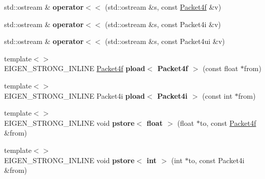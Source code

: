 \begin{DoxyCompactItemize}
std\+::ostream \& {\bfseries operator$<$$<$} (std\+::ostream \&s, const \hyperlink{struct_eigen_1_1internal_1_1_packet4f}{Packet4f} \&v)
\item 
\mbox{\label{namespace_eigen_1_1internal_a0d0a3677eb761c7d67b3e233c6579fae}} 
std\+::ostream \& {\bfseries operator$<$$<$} (std\+::ostream \&s, const Packet4i \&v)
\item 
\mbox{\label{namespace_eigen_1_1internal_aa6202cd36045cfe9df10d714518c698e}} 
std\+::ostream \& {\bfseries operator$<$$<$} (std\+::ostream \&s, const Packet4ui \&v)
\item 
\mbox{\label{namespace_eigen_1_1internal_a63e92b056e3378b0853f510fdb6757b2}} 
{\footnotesize template$<$$>$ }\\E\+I\+G\+E\+N\+\_\+\+S\+T\+R\+O\+N\+G\+\_\+\+I\+N\+L\+I\+NE \hyperlink{struct_eigen_1_1internal_1_1_packet4f}{Packet4f} {\bfseries pload$<$ Packet4f $>$} (const float $\ast$from)
\item 
\mbox{\label{namespace_eigen_1_1internal_ae1c0b08faef0da90bb6fa78856bcf726}} 
{\footnotesize template$<$$>$ }\\E\+I\+G\+E\+N\+\_\+\+S\+T\+R\+O\+N\+G\+\_\+\+I\+N\+L\+I\+NE Packet4i {\bfseries pload$<$ Packet4i $>$} (const int $\ast$from)
\item 
\mbox{\label{namespace_eigen_1_1internal_a9ee8e4444b597c94c387d0c22c85adb3}} 
{\footnotesize template$<$$>$ }\\E\+I\+G\+E\+N\+\_\+\+S\+T\+R\+O\+N\+G\+\_\+\+I\+N\+L\+I\+NE void {\bfseries pstore$<$ float $>$} (float $\ast$to, const \hyperlink{struct_eigen_1_1internal_1_1_packet4f}{Packet4f} \&from)
\item 
\mbox{\label{namespace_eigen_1_1internal_a69543ee212c1a509337b1146984e5acc}} 
{\footnotesize template$<$$>$ }\\E\+I\+G\+E\+N\+\_\+\+S\+T\+R\+O\+N\+G\+\_\+\+I\+N\+L\+I\+NE void {\bfseries pstore$<$ int $>$} (int $\ast$to, const Packet4i \&from)
\item 
\mbox{\label{namespace_eigen_1_1internal_a923941269228f9ceaf233636da958609}} 

\end{DoxyCompactItemize}
